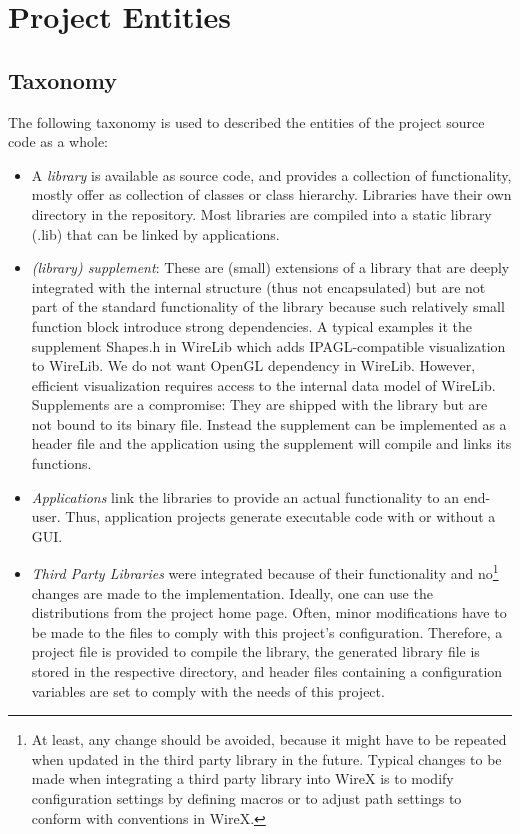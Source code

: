\documentclass[11pt,a4paper,onepage,openany]{book}
\begin{document}
\chapter{Project Entities}
\section{Taxonomy}
The following taxonomy is used to described the entities of the project
source
code as a whole:
\begin{itemize}
  \item A \emph{library} is available as source code, and provides a
      collection of functionality, mostly offer as collection of classes or
      class hierarchy. Libraries have their own directory in the repository.
      Most libraries are compiled into a static library (.lib) that can be
      linked by applications.

  \item \emph{(library) supplement}: These are (small) extensions of a
      library that are deeply integrated with the internal structure (thus
      not encapsulated) but are not part of the standard functionality of the
      library because such relatively small function block introduce strong
      dependencies. A typical examples it the supplement Shapes.h in WireLib
      which adds IPAGL-compatible visualization to WireLib. We do not want
      OpenGL dependency in WireLib. However, efficient visualization requires
      access to the internal data model of WireLib. Supplements are a
      compromise: They are shipped with the library but are not bound to its
      binary file. Instead the supplement can be implemented as a header file
      and the application using the supplement will compile and links its
      functions.

  \item \emph{Applications} link the libraries to provide an actual
      functionality to an end-user. Thus, application projects generate
      executable code with or without a GUI.

  \item \emph{Third Party Libraries} were integrated because of their
      functionality and no\footnote{At least, any change should be avoided,
      because it might have to be repeated when updated in the third party
      library in the future. Typical changes to be made when integrating a
      third party library into WireX is to modify configuration settings by
      defining macros or to adjust path settings to conform with conventions
      in WireX.} changes are made to the implementation. Ideally, one can use
      the distributions from the project home page. Often, minor
      modifications have to be made to the files to comply with this
      project's configuration. Therefore, a project file is provided to
      compile the library, the generated library file is stored in the
      respective directory, and header files containing a configuration
      variables are set to comply with the needs of this project.


\end{itemize}
\end{document}

